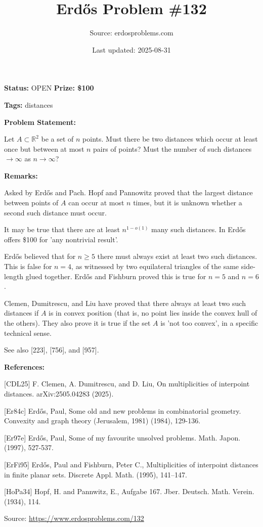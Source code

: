 \documentclass{article}
\title{Erd\H{o}s Problem \#132}
\date{Last updated: 2025-08-31}
\author{Source: erdosproblems.com}
\begin{document}
\maketitle

\noindent\textbf{Status:} OPEN \quad \textbf{Prize: \$100}

\noindent\textbf{Tags:} distances

\medskip
\noindent\textbf{Problem Statement:}

Let $A\subset \mathbb{R}^2$ be a set of $n$ points. Must there be two distances which occur at least once but between at most $n$ pairs of points? Must the number of such distances $\to \infty$ as $n\to \infty$?

\bigskip
\noindent\textbf{Remarks:}

Asked by Erd\H{o}s and Pach. Hopf and Pannowitz \cite{HoPa34} proved that the largest distance between points of $A$ can occur at most $n$ times, but it is unknown whether a second such distance must occur.

It may be true that there are at least $n^{1-o(1)}$ many such distances. In \cite{Er97e} Erd\H{o}s offers \$100 for 'any nontrivial result'.

Erd\H{o}s \cite{Er84c} believed that for $n\geq 5$ there must always exist at least two such distances. This is false for $n=4$, as witnessed by two equilateral triangles of the same side-length glued together. Erd\H{o}s and Fishburn \cite{ErFi95} proved this is true for $n=5$ and $n=6$.

Clemen, Dumitrescu, and Liu \cite{CDL25} have proved that there always at least two such distances if $A$ is in convex position (that is, no point lies inside the convex hull of the others). They also prove it is true if the set $A$ is 'not too convex', in a specific technical sense.

See also [223], [756], and [957].

\bigskip
\noindent\textbf{References:}

[CDL25] F. Clemen, A. Dumitrescu, and D. Liu, On multiplicities of interpoint distances. arXiv:2505.04283 (2025).
 
 [Er84c] Erd\H{o}s, Paul, Some old and new problems in combinatorial geometry. Convexity and graph theory (Jerusalem, 1981) (1984), 129-136.
 
 [Er97e] Erd\H{o}s, Paul, Some of my favourite unsolved problems. Math. Japon. (1997), 527-537.
 
 [ErFi95] Erd\H{o}s, Paul and Fishburn, Peter C., Multiplicities of interpoint distances in finite planar sets. Discrete Appl. Math. (1995), 141--147.
 
 [HoPa34] Hopf, H. and Pannwitz, E., Aufgabe 167. Jber. Deutsch. Math. Verein. (1934), 114.

\bigskip
\noindent\small{Source: \url{https://www.erdosproblems.com/132}}
\end{document}
